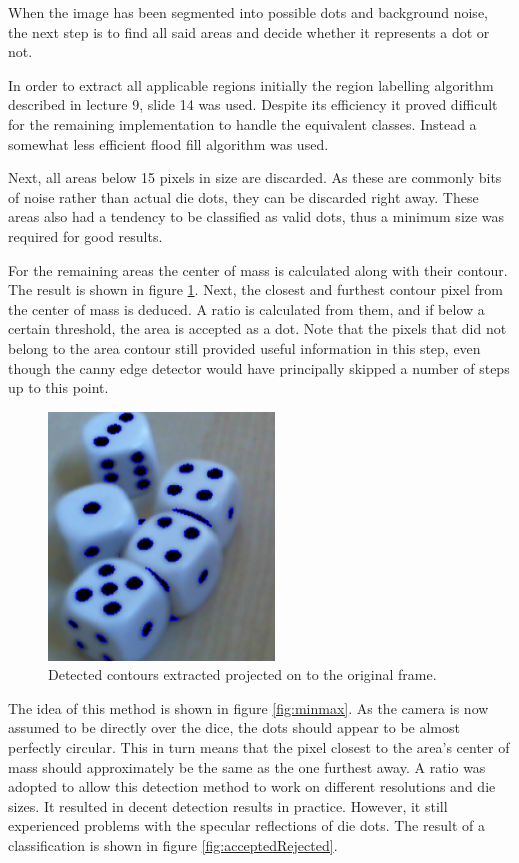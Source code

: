 When the image has been segmented into possible dots and background noise, the next step is to find all said areas and decide whether it represents a dot or not. 

In order to extract all applicable regions initially the region labelling algorithm described in lecture 9, slide 14 was used. Despite its efficiency it proved difficult for the remaining implementation to handle the equivalent classes. Instead a somewhat less efficient flood fill algorithm was used. 

Next, all areas below 15 pixels in size are discarded. As these are commonly bits of noise rather than actual die dots, they can be discarded right away. These areas also had a tendency to be classified as valid dots, thus a minimum size was required for good results.

For the remaining areas the center of mass is calculated along with their contour. The result is shown in figure \ref{fig:contour}. Next, the closest and furthest contour pixel from the center of mass is deduced. A ratio is calculated from them, and if below a certain threshold, the area is accepted as a dot. Note that the pixels that did not belong to the area contour still provided useful information in this step, even though the canny edge detector would have principally skipped a number of steps up to this point.

\begin{figure}
	\centering
	\includegraphics[width=60mm]{images/dies/contour.png}
	\caption{Detected contours extracted projected on to the original frame.}
	\label{fig:contour}
\end{figure}

The idea of this method is shown in figure \ref{fig:minmax}. As the camera is now assumed to be directly over the dice, the dots should appear to be almost perfectly circular. This in turn means that the pixel closest to the area's center of mass should approximately be the same as the one furthest away. A ratio was adopted to allow this detection method to work on different resolutions and die sizes. It resulted in decent detection results in practice. However, it still experienced problems with the specular reflections of die dots. The result of a classification is shown in figure \ref{fig:acceptedRejected}.

